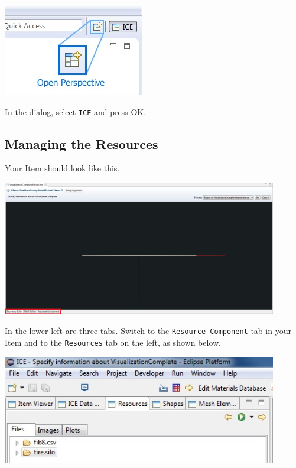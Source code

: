 \begin{center}
\includegraphics{images/ICE_OpenPerspective}
\end{center}

In the dialog, select \texttt{ICE} and press {OK}.

\subsection{Managing the Resources}

Your Item should look like this.

\begin{center}
\includegraphics[width=12cm]{images/ItemTabs}
\end{center}

In the lower left are three tabs. Switch to the \texttt{Resource Component} tab
in your Item and to the \texttt{Resources} tab on the left, as shown below.

\begin{center}
\includegraphics[width=12cm]{images/ResourcesTab}
\end{center}

